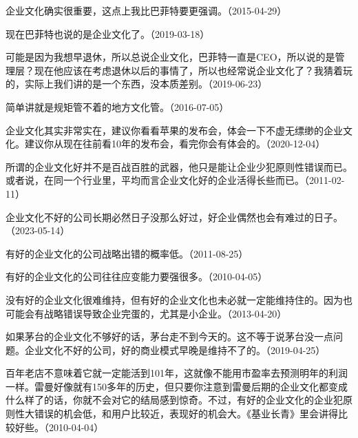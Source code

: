 企业文化确实很重要，这点上我比巴菲特要更强调。（2015-04-29）


现在巴菲特也说的是企业文化了。（2019-03-18）

可能是因为我想早退休，所以总说企业文化，巴菲特一直是CEO，所以说的是管理层？现在他应该在考虑退休以后的事情了，所以也经常说企业文化了？我猜着玩的，实际上我们讲的是一个东西，没本质差别。（2019-06-23）


简单讲就是规矩管不着的地方文化管。（2016-07-05）


企业文化其实非常实在，建议你看看苹果的发布会，体会一下不虚无缥缈的企业文化。建议你从现在往前看10年的发布会，看完你会有体会的。（2020-12-04）

所谓的企业文化好并不是百战百胜的武器，他只是能让企业少犯原则性错误而已。或者说，在同一个行业里，平均而言企业文化好的企业活得长些而已。（2011-02-11）

企业文化不好的公司长期必然日子没那么好过，好企业偶然也会有难过的日子。（2023-05-14）


有好的企业文化的公司战略出错的概率低。（2011-08-25）

有好的企业文化的公司往往应变能力要强很多。（2010-04-05）


没有好的企业文化很难维持，但有好的企业文化也未必就一定能维持住的。因为也可能会有战略错误导致企业完蛋的，尤其是小企业。（2013-04-20）


如果茅台的企业文化不够好的话，茅台走不到今天的。这不等于说茅台没一点问题。企业文化不好的公司，好的商业模式早晚是维持不了的。（2019-04-25）


百年老店不意味着它就一定能活到101年，这就像不能用市盈率去预测明年的利润一样。雷曼好像就有150多年的历史，但只要你注意到雷曼后期的企业文化都变成什么样了的话，你就不会对它的结局感到惊奇。不过，有好的企业文化的企业犯原则性大错误的机会低，和用户比较近，表现好的机会大。《基业长青》里会讲得比较好些。（2010-04-04）


